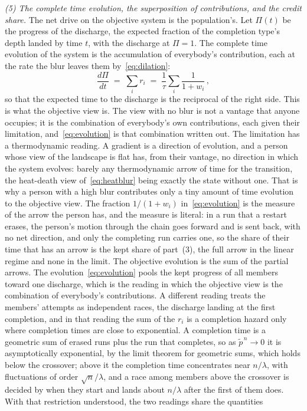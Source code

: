 \documentclass{article}
\begin{document}
\emph{(5) The complete time evolution, the superposition of contributions, and the credit share.} The net drive on the objective system is the population's. Let $\Pi(t)$ be the progress of the discharge, the expected fraction of the completion type's depth landed by time $t$, with the discharge at $\Pi = 1$. The complete time evolution of the system is the accumulation of everybody's contribution, each at the rate the blur leaves them by~\eqref{eq:dilation}:
\begin{equation}\label{eq:evolution}
  \frac{d\Pi}{dt} \;=\; \sum_i r_i \;=\; \frac{1}{\tau}\sum_i \frac{1}{1 + w_i}\,,
\end{equation}
so that the expected time to the discharge is the reciprocal of the right side. This is what the objective view is. The view with no blur is not a vantage that anyone occupies; it is the combination of everybody's own contributions, each given their limitation, and~\eqref{eq:evolution} is that combination written out. The limitation has a thermodynamic reading. A gradient is a direction of evolution, and a person whose view of the landscape is flat has, from their vantage, no direction in which the system evolves: barely any thermodynamic arrow of time for the transition, the heat-death view of~\eqref{eq:heatblur} being exactly the state without one. That is why a person with a high blur contributes only a tiny amount of time evolution to the objective view. The fraction $1/(1+w_i)$ in~\eqref{eq:evolution} is the measure of the arrow the person has, and the measure is literal: in a run that a restart erases, the person's motion through the chain goes forward and is sent back, with no net direction, and only the completing run carries one, so the share of their time that has an arrow is the kept share of part~(3), the full arrow in the linear regime and none in the limit. The objective evolution is the sum of the partial arrows. The evolution~\eqref{eq:evolution} pools the kept progress of all members toward one discharge, which is the reading in which the objective view is the combination of everybody's contributions. A different reading treats the members' attempts as independent races, the discharge landing at the first completion, and in that reading the sum of the $r_i$ is a completion hazard only where completion times are close to exponential. A completion time is a geometric sum of erased runs plus the run that completes, so as $\widetilde{p}^{\,n} \to 0$ it is asymptotically exponential, by the limit theorem for geometric sums, which holds below the crossover; above it the completion time concentrates near $n/\lambda$, with fluctuations of order $\sqrt{n}/\lambda$, and a race among members above the crossover is decided by when they start and lands about $n/\lambda$ after the first of them does. With that restriction understood, the two readings share the quantities
\end{document}
